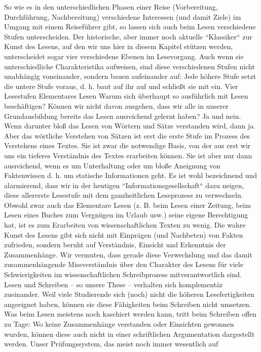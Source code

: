 \documentclass[]{book}
\theoremstyle{definition}
\theoremstyle{definition}
\theoremstyle{definition}
\theoremstyle{remark}
\begin{document}
So wie es in den unterschiedlichen Phasen einer Reise (Vorbereitung,
Durchführung, Nachbereitung) verschiedene Interessen (und damit Ziele)
im Umgang mit einem Reiseführer gibt, so lassen sich auch beim Lesen
verschiedene Stufen unterscheiden. Der historische, aber immer noch
aktuelle ``Klassiker`` zur Kunst des Lesens, auf den wir uns hier in
diesem Kapitel stützen werden, unterscheidet sogar vier verschiedene
Ebenen im Lesevorgang. Auch wenn sie unterschiedliche Charakteristika
aufweisen, sind diese verschiedenen Stufen nicht unabhängig voneinander,
sondern bauen aufeinander auf: Jede höhere Stufe setzt die untere Stufe
voraus, d. h. baut auf ihr auf und schließt sie mit ein. Vier Lesestufen
Elementares Lesen Warum sich überhaupt so ausführlich mit Lesen
beschäftigen? Können wir nicht davon ausgehen, dass wir alle in unserer
Grundausbildung bereits das Lesen ausreichend gelernt haben? Ja und
nein. Wenn darunter bloß das Lesen von Wörtern und Sätze verstanden
wird, dann ja. Aber das wörtliche Verstehen von Sätzen ist erst die
erste Stufe im Prozess des Verstehens eines Textes. Sie ist zwar die
notwendige Basis, von der aus erst wir uns ein tieferes Verständnis des
Textes erarbeiten können. Sie ist aber nur dann ausreichend, wenn es um
Unterhaltung oder um bloße Aneignung von Faktenwissen d. h. um statische
Informationen geht. Es ist wohl bezeichnend und alarmierend, dass wir in
der heutigen ``Informationsgesellschaft`` dazu neigen, diese allererste
Lesestufe mit dem ganzheitlichen Leseprozess zu verwechseln. Obwohl zwar
auch das Elementare Lesen (z. B. beim Lesen einer Zeitung, beim Lesen
eines Buches zum Vergnügen im Urlaub usw.) seine eigene Berechtigung
hat, ist es zum Erarbeiten von wissenschaftlichen Texten zu wenig. Die
wahre Kunst des Lesens gibt sich nicht mit Einprägen (und Nachbeten) von
Fakten zufrieden, sondern beruht auf Verständnis, Einsicht und
Erkenntnis der Zusammenhänge. Wir vermuten, dass gerade diese
Verwechslung und das damit zusammenhängende Missverständnis über den
Charakter des Lesens für viele Schwierigkeiten im wissenschaftlichen
Schreibprozess mitverantwortlich sind. Lesen und Schreiben -- so unsere
These -- verhalten sich komplementär zueinander. Weil viele Studierende
sich (noch) nicht die höheren Lesefertigkeiten angeeignet haben, können
sie diese Fähigkeiten beim Schreiben nicht umsetzen. Was beim Lesen
meistens noch kaschiert werden kann, tritt beim Schreiben offen zu Tage:
Wo keine Zusammenhänge verstanden oder Einsichten gewonnen wurden,
können diese auch nicht in einer schriftlichen Argumentation dargestellt
werden. Unser Prüfungssystem, das meist noch immer wesentlich auf
\end{document}
